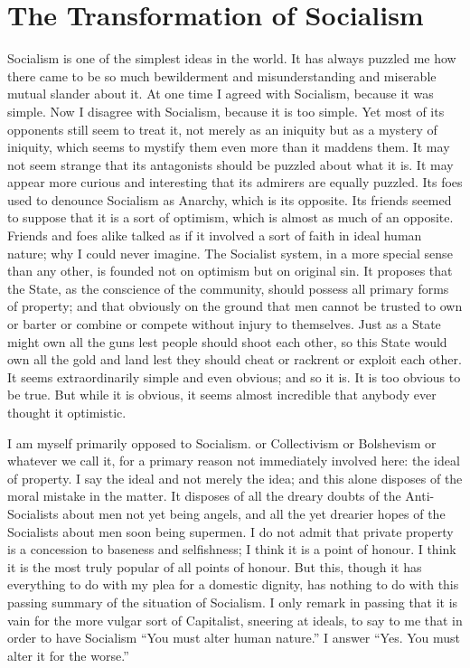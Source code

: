 \documentclass{book}
\begin{document}
\chapter{The Transformation of Socialism}
\label{chapter-17}
Socialism is one of the simplest ideas in the world. It has always puzzled me how there came to be so much bewilderment and misunderstanding and miserable mutual slander about it. At one time I agreed with Socialism, because it was simple. Now I disagree with Socialism, because it is too simple. Yet most of its opponents still seem to treat it, not merely as an iniquity but as a mystery of iniquity, which seems to mystify them even more than it maddens them. It may not seem strange that its antagonists should be puzzled about what it is. It may appear more curious and interesting that its admirers are equally puzzled. Its foes used to denounce Socialism as Anarchy, which is its opposite. Its friends seemed to suppose that it is a sort of optimism, which is almost as much of an opposite. Friends and foes alike talked as if it involved a sort of faith in ideal human nature; why I could never imagine. The Socialist system, in a more special sense than any other, is founded not on optimism but on original sin. It proposes that the State, as the conscience of the community, should possess all primary forms of property; and that obviously on the ground that men cannot be trusted to own or barter or combine or compete without injury to themselves. Just as a State might own all the guns lest people should shoot each other, so this State would own all the gold and land lest they should cheat or rackrent or exploit each other. It seems extraordinarily simple and even obvious; and so it is. It is too obvious to be true. But while it is obvious, it seems almost incredible that anybody ever thought it optimistic.

I am myself primarily opposed to Socialism. or Collectivism or Bolshevism or whatever we call it, for a primary reason not immediately involved here: the ideal of property. I say the ideal and not merely the idea; and this alone disposes of the moral mistake in the matter. It disposes of all the dreary doubts of the Anti-Socialists about men not yet being angels, and all the yet drearier hopes of the Socialists about men soon being supermen. I do not admit that private property is a concession to baseness and selfishness; I think it is a point of honour. I think it is the most truly popular of all points of honour. But this, though it has everything to do with my plea for a domestic dignity, has nothing to do with this passing summary of the situation of Socialism. I only remark in passing that it is vain for the more vulgar sort of Capitalist, sneering at ideals, to say to me that in order to have Socialism “You must alter human nature.” I answer “Yes. You must alter it for the worse.”
\end{document}

